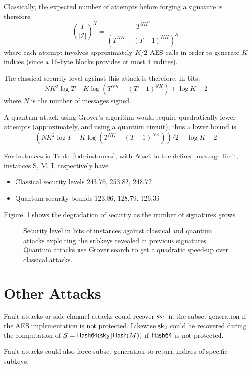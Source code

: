 Classically, the expected number of attempts before forging a signature is therefore
\[
\left(\frac{T}{\vert \mathcal I\vert}\right)^K = \frac{T^{NK^2}}{(T^{NK} - (T-1)^{NK})^K}
\]
where each attempt involves approximately $K/2$ AES calls in order to generate $K$ indices (since a 16-byte blocks provides at most 4 indices).

The classical security level against this attack is therefore, in bits:
\[
NK^2 \log T - K \log(T^{NK} - (T-1)^{NK}) + \log K - 2
\]
where $N$ is the number of messages signed.

A quantum attack using Grover's algorithm would require quadratically fewer attempts (approximately, and using a quantum circuit), thus a lower bound is
\[
(NK^2 \log T - K \log(T^{NK} - (T-1)^{NK}))/2 + \log K - 2
\]

For \gravity instances in Table~\ref{tab:instances}, with $N$ set to the defined message limit, instances S, M, L respectively have
\begin{itemize}
    \item Classical security levels 243.76, 253.82, 248.72
    \item Quantum security bounds 123.86, 128.79, 126.36
\end{itemize}
Figure~\ref{fig:security} shows the degradation of security as the number of signatures grows.
 

\begin{figure}
\centering
\centering
\caption{Security level in bits of \gravity instances against classical and quantum attacks exploiting the subkeys revealed in previous signatures. Quantum attacks use Grover search to get a quadratic speed-up over classical attacks.}
\label{fig:security}
\end{figure}

\section{Other Attacks}

Fault attacks or side-channel attacks could recover $\mathsf{sk}_1$ in the subset generation if the AES implementation is not protected.
Likewise $\mathsf{sk}_2$ could be recovered during the computation of $S=\textsf{Hash64}(\mathsf{sk}_2 \Vert \textsf{Hash}(M))$ if $\textsf{Hash64}$ is not protected.

Fault attacks could also force subset generation to return indices of specific subkeys.

